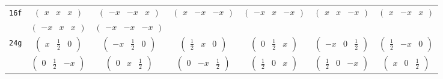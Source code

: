 \documentclass[fleqn,9pt,landscape]{jsarticle}
\begin{document}
\begin{center}
\begin{longtable}{ccccccc}
{\tt 16f} & $ \begin{pmatrix} x & x & x \end{pmatrix} $ & $ \begin{pmatrix} - x & - x & x \end{pmatrix} $ & $ \begin{pmatrix} x & - x & - x \end{pmatrix} $ & $ \begin{pmatrix} - x & x & - x \end{pmatrix} $ & $ \begin{pmatrix} x & x & - x \end{pmatrix} $ & $ \begin{pmatrix} x & - x & x \end{pmatrix} $ \\
& $ \begin{pmatrix} - x & x & x \end{pmatrix} $ & $ \begin{pmatrix} - x & - x & - x \end{pmatrix} $ & $  $ & $  $ & $  $ & $  $ \\ \hline
{\tt 24g} & $ \begin{pmatrix} x & \frac{1}{2} & 0 \end{pmatrix} $ & $ \begin{pmatrix} - x & \frac{1}{2} & 0 \end{pmatrix} $ & $ \begin{pmatrix} \frac{1}{2} & x & 0 \end{pmatrix} $ & $ \begin{pmatrix} 0 & \frac{1}{2} & x \end{pmatrix} $ & $ \begin{pmatrix} - x & 0 & \frac{1}{2} \end{pmatrix} $ & $ \begin{pmatrix} \frac{1}{2} & - x & 0 \end{pmatrix} $ \\
& $ \begin{pmatrix} 0 & \frac{1}{2} & - x \end{pmatrix} $ & $ \begin{pmatrix} 0 & x & \frac{1}{2} \end{pmatrix} $ & $ \begin{pmatrix} 0 & - x & \frac{1}{2} \end{pmatrix} $ & $ \begin{pmatrix} \frac{1}{2} & 0 & x \end{pmatrix} $ & $ \begin{pmatrix} \frac{1}{2} & 0 & - x \end{pmatrix} $ & $ \begin{pmatrix} x & 0 & \frac{1}{2} \end{pmatrix} $ \\ \hline

\end{longtable}
\end{center}
\end{document}
